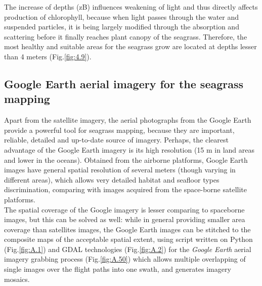 \documentclass[11pt]{article}
\begin{document}
The increase of depths (zB) influences weakening of light and thus directly affects
production of chlorophyll, because when light passes through the water and suspended particles, it is
being largely modified through the absorption and scattering before it finally reaches plant canopy of
the seagrass. Therefore, the most healthy and suitable areas for the seagrass grow are located at depths
lesser than 4 meters (Fig.\ref{fig:4.9})\label{page-37}.

\subsection[Google Earth aerial imagery]{Google Earth aerial imagery for the seagrass mapping}
Apart from the satellite imagery, the aerial photographs from the Google Earth provide
a powerful tool for seagrass mapping, because they are important, reliable, detailed
and up-to-date source of imagery.
Perhaps, the clearest advantage of the Google Earth imagery is its high resolution (15 m in land areas and lower in the oceans).
Obtained from the airborne platforms, Google Earth images have general spatial
resolution of several meters (though varying in different areas), which allows very
detailed habitat and seafloor types discrimination, comparing with images
acquired from the space-borne satellite platforms.\\
The spatial coverage of the Google imagery is lesser comparing to spaceborne images, but this can be solved as
well: while in general providing smaller area coverage than satellites images, the Google Earth
images can be stitched to the composite maps of the acceptable spatial extent, using script written on Python (Fig.\ref{fig:A.1}) and \ac{GDAL} technologies (Fig.\ref{fig:A.2})\label{gdal} for the \textit{Google Earth} aerial imagery grabbing process (Fig.\ref{fig:A.50}\label{GG-1}) which allows multiple overlapping of single images over the flight paths into one swath, and generates imagery mosaics.
\end{document}
